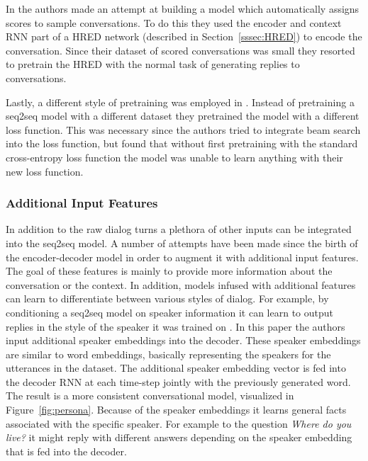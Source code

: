 \documentclass[12pt]{article}
\begin{document}
In \cite{Lowe:2017} the authors made an attempt at building a model which automatically assigns scores to sample conversations. To do this they used the encoder and context RNN part of a HRED network (described in Section~\ref{sssec:HRED}) to encode the conversation. Since their dataset of scored conversations was small they resorted to pretrain the HRED with the normal task of generating replies to conversations.

Lastly, a different style of pretraining was employed in \cite{Wiseman:2016}. Instead of pretraining a seq2seq model with a different dataset they pretrained the model with a different loss function. This was necessary since the authors tried to integrate beam search into the loss function, but found that without first pretraining with the standard cross-entropy loss function the model was unable to learn anything with their new loss function.

\subsubsection{Additional Input Features} \label{sssec:priors}
In addition to the raw dialog turns a plethora of other inputs can be integrated into the seq2seq model. A number of attempts have been made since the birth of the encoder-decoder model in order to augment it with additional input features. The goal of these features is mainly to provide more information about the conversation or the context. In addition, models infused with additional features can learn to differentiate between various styles of dialog. For example, by conditioning a seq2seq model on speaker information it can learn to output replies in the style of the speaker it was trained on \cite{Li:2016}. In this paper the authors input additional speaker embeddings into the decoder. These speaker embeddings are similar to word embeddings, basically representing the speakers for the utterances in the dataset. The additional speaker embedding vector is fed into the decoder RNN at each time-step jointly with the previously generated word. The result is a more consistent conversational model, visualized in Figure~\ref{fig:persona}. Because of the speaker embeddings it learns general facts associated with the specific speaker. For example to the question \textit{Where do you live?} it might reply with different answers depending on the speaker embedding that is fed into the decoder. 
\end{document}
